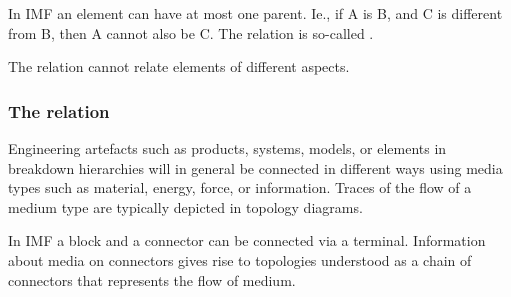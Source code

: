 \documentclass[../main.tex]{subfiles}
\begin{document}


In IMF an element can have at most one  parent. Ie., if A is  B, and C is different from B, then A cannot also be   C.  The  relation is so-called . 

The  relation cannot relate elements of different aspects. 


\subsubsection{The  relation}
Engineering artefacts such as products, systems, models, or elements in breakdown hierarchies  will in general be connected in different ways using  media types such as material, energy, force, or information. Traces of the flow of a medium type are typically depicted in topology diagrams.

In IMF a block and a connector can be connected via a terminal.  Information about media on connectors gives rise to topologies understood as a chain of connectors that represents the flow of medium.
\end{document}
